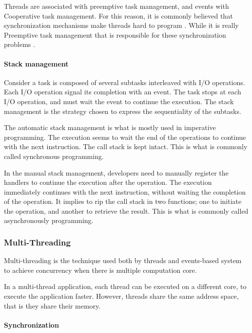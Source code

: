Threads are associated with preemptive task management, and events with Cooperative task management.
For this reason, it is commonly believed that synchronization mechanisms make threads hard to program \cite{Ousterhout1996}.
While it is really Preemptive task management that is responsible for these synchronization problems \cite{Adya2002}.

\paragraph{Stack management}

Consider a task is composed of several subtasks interleaved with I/O operations.
Each I/O operation signal its completion with an event.
The task stops at each I/O operation, and must wait the event to continue the execution.
The stack management is the strategy chosen to express the sequentiality of the subtasks.

The automatic stack management is what is mostly used in imperative programming.
The execution seems to wait the end of the operations to continue with the next instruction.
The call stack is kept intact.
This is what is commonly called synchronous programming.

In the manual stack management, developers need to manually register the handlers to continue the execution after the operation.
The execution immediately continues with the next instruction, without waiting the completion of the operation.
It implies to rip the call stack in two functions; one to initiate the operation, and another to retrieve the result.
This is what is commonly called asynchronously programming.





\subsubsection{Multi-Threading}

Multi-threading is the technique used both by threads and events-based system to achieve concurrency when there is multiple computation core.



In a multi-thread application, each thread can be executed on a different core, to execute the application faster.
However, threads share the same address space, that is they share their memory.


\paragraph{Synchronization}



